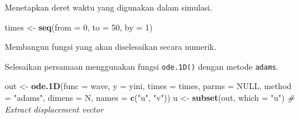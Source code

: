 \documentclass[]{book}
\newenvironment{Shaded}{\begin{snugshade}}{\end{snugshade}}
\newcommand{\CommentTok}[1]{\textcolor[rgb]{0.56,0.35,0.01}{\textit{#1}}}
\newcommand{\ControlFlowTok}[1]{\textcolor[rgb]{0.13,0.29,0.53}{\textbf{#1}}}
\newcommand{\DataTypeTok}[1]{\textcolor[rgb]{0.13,0.29,0.53}{#1}}
\newcommand{\DecValTok}[1]{\textcolor[rgb]{0.00,0.00,0.81}{#1}}
\newcommand{\KeywordTok}[1]{\textcolor[rgb]{0.13,0.29,0.53}{\textbf{#1}}}
\newcommand{\NormalTok}[1]{#1}
\newcommand{\OperatorTok}[1]{\textcolor[rgb]{0.81,0.36,0.00}{\textbf{#1}}}
\newcommand{\OtherTok}[1]{\textcolor[rgb]{0.56,0.35,0.01}{#1}}
\newcommand{\StringTok}[1]{\textcolor[rgb]{0.31,0.60,0.02}{#1}}
\theoremstyle{definition}
\theoremstyle{definition}
\theoremstyle{definition}
\theoremstyle{remark}
\begin{document}
Menetapkan deret waktu yang digunakan dalam simulasi.

\begin{Shaded}
\begin{Highlighting}[]
\NormalTok{times <-}\StringTok{ }\KeywordTok{seq}\NormalTok{(}\DataTypeTok{from =} \DecValTok{0}\NormalTok{, }\DataTypeTok{to =} \DecValTok{50}\NormalTok{, }\DataTypeTok{by =} \DecValTok{1}\NormalTok{)}
\end{Highlighting}
\end{Shaded}

Membangun fungsi yang akan diselesaikan secara numerik.

\begin{Shaded}
\end{Shaded}

Selesaikan persamaan menggunakan fungsi \texttt{ode.1D()} dengan metode \texttt{adams}.

\begin{Shaded}
\begin{Highlighting}[]
\NormalTok{out <-}\StringTok{ }\KeywordTok{ode.1D}\NormalTok{(}\DataTypeTok{func =}\NormalTok{ wave, }\DataTypeTok{y =}\NormalTok{ yini, }\DataTypeTok{times =}\NormalTok{ times,}
             \DataTypeTok{parms =} \OtherTok{NULL}\NormalTok{, }\DataTypeTok{method =} \StringTok{"adams"}\NormalTok{,}
             \DataTypeTok{dimens =}\NormalTok{ N, }\DataTypeTok{names =} \KeywordTok{c}\NormalTok{(}\StringTok{"u"}\NormalTok{, }\StringTok{"v"}\NormalTok{))}
\NormalTok{u <-}\StringTok{ }\KeywordTok{subset}\NormalTok{(out, }\DataTypeTok{which =} \StringTok{"u"}\NormalTok{) }\CommentTok{# Extract displacement vector}
\end{Highlighting}
\end{Shaded}
\end{document}
